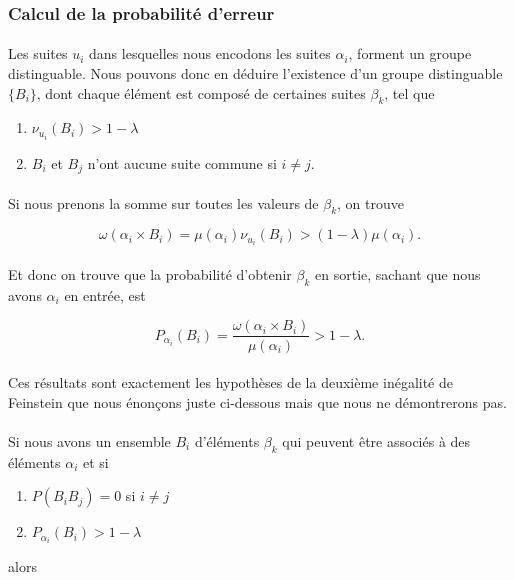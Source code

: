 \subsubsection*{Calcul de la probabilité d'erreur}
	
	\paragraph{}
	Les suites $u_i$ dans lesquelles nous encodons les suites $\alpha_i$,
	forment un groupe distinguable. Nous pouvons donc en déduire l'existence
	d'un groupe distinguable $\{B_i\}$, dont chaque élément est composé de 
	certaines suites $\beta_k$, tel que 
	\begin{enumerate}
		\item $\nu_{u_i}(B_i) > 1-\lambda$
		\item $B_i$ et $B_j$ n'ont aucune suite commune si $i\neq j$.
	\end{enumerate}
	
	\paragraph{}Si nous prenons la somme sur toutes les valeurs de $\beta_k$,
	on trouve
	
	\[
		\omega(\alpha_i \times B_i)=
		\mu(\alpha_i)\nu_{u_i}(B_i)>(1-\lambda)\mu(\alpha_i).
	\]
	
	\paragraph{}
	Et donc on trouve que la probabilité d'obtenir $\beta_k$ en sortie,
	sachant que nous avons $\alpha_i$ en entrée, est
	
	\[
		P_{\alpha_i}(B_i)=
		\frac{\omega(\alpha_i \times B_i)}{\mu(\alpha_i)}>1-\lambda.
	\]
	
	\paragraph{}
	Ces résultats sont exactement les hypothèses de la deuxième inégalité 
	de Feinstein que nous énonçons juste ci-dessous mais que nous ne 
	démontrerons pas.
	
	\paragraph{}
	Si nous avons un ensemble $B_i$ d'éléments $\beta_k$ qui peuvent être
	associés à des éléments $\alpha_i$ et si 
	\begin{enumerate}
		\item $P(B_iB_j)=0$ si $i\neq j$
		\item $P_{\alpha_i}(B_i)>1-\lambda$
	\end{enumerate}
	alors 
	
